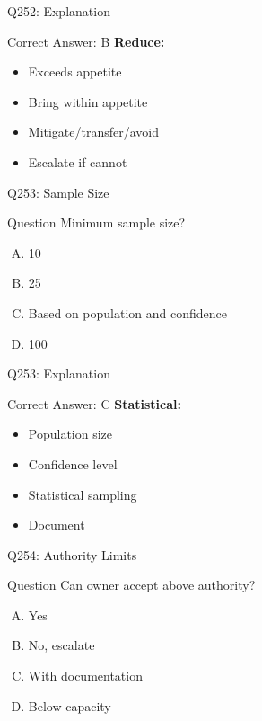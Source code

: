 \documentclass{beamer}
\begin{document}
	\begin{frame}{Q252: Explanation}
		\begin{block}{Correct Answer: B}
			\textbf{Reduce:}
			\begin{itemize}
				\item Exceeds appetite
				\item Bring within appetite
				\item Mitigate/transfer/avoid
				\item Escalate if cannot
			\end{itemize}
		\end{block}
	\end{frame}
	
	\begin{frame}{Q253: Sample Size}
		\begin{block}{Question}
			Minimum sample size?
		\end{block}
		\begin{enumerate}[(A)]
			\item 10
			\item 25
			\item Based on population and confidence
			\item 100
		\end{enumerate}
	\end{frame}
	
	\begin{frame}{Q253: Explanation}
		\begin{block}{Correct Answer: C}
			\textbf{Statistical:}
			\begin{itemize}
				\item Population size
				\item Confidence level
				\item Statistical sampling
				\item Document
			\end{itemize}
		\end{block}
	\end{frame}
	
	\begin{frame}{Q254: Authority Limits}
		\begin{block}{Question}
			Can owner accept above authority?
		\end{block}
		\begin{enumerate}[(A)]
			\item Yes
			\item No, escalate
			\item With documentation
			\item Below capacity
		\end{enumerate}
	\end{frame}
	
\end{document}
